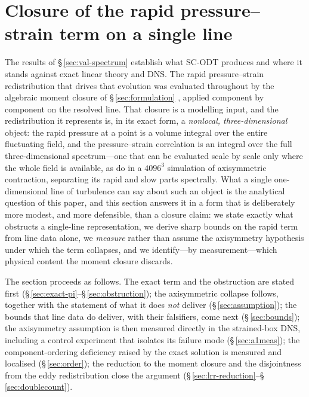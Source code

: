 \documentclass[lineno]{JFM-FLM_Au}
\begin{document}
\section{Closure of the rapid pressure--strain term on a single line}\label{sec:gate}

The results of \S\,\ref{sec:val-spectrum} establish what SC-ODT
produces and where it stands against exact linear theory and DNS. The
rapid pressure--strain redistribution that drives that evolution was
evaluated throughout by the algebraic moment closure of
\S\,\ref{sec:formulation} \citep{LaunderReeceRodi1975}, applied component by
component on the resolved line. That closure is a modelling input, and the
redistribution it represents is, in its exact form, a \emph{nonlocal,
three-dimensional} object: the rapid pressure at a point is a volume
integral over the entire fluctuating field, and the pressure--strain
correlation is an integral over the full three-dimensional spectrum---one
that can be evaluated scale by scale only where the whole field is
available, as \citet{ClayYeung2016} do in a $4096^3$ simulation of
axisymmetric contraction, separating its rapid and slow parts spectrally.
What a
single one-dimensional line of turbulence can say about such an object is
the analytical question of this paper, and this section answers it in a
form that is deliberately more modest, and more defensible, than a closure
claim: we state exactly what obstructs a single-line representation, we
derive sharp bounds on the rapid term from line data alone, we
\emph{measure} rather than assume the axisymmetry hypothesis under which
the term collapses, and we identify---by measurement---which physical
content the moment closure discards.

The section proceeds as follows. The exact term and the obstruction are
stated first (\S\,\ref{sec:exact-pi}--\S\,\ref{sec:obstruction}); the
axisymmetric collapse follows, together with the statement of what it does
\emph{not} deliver (\S\,\ref{sec:assumption}); the bounds that line data do
deliver, with their falsifiers, come next (\S\,\ref{sec:bounds}); the
axisymmetry assumption is then measured directly in the strained-box DNS,
including a control experiment that isolates its failure mode
(\S\,\ref{sec:a1meas}); the component-ordering deficiency raised by the
exact solution is measured and localised (\S\,\ref{sec:order}); the
reduction to the moment closure and the disjointness from the eddy
redistribution close the argument
(\S\,\ref{sec:lrr-reduction}--\S\,\ref{sec:doublecount}).
\end{document}

